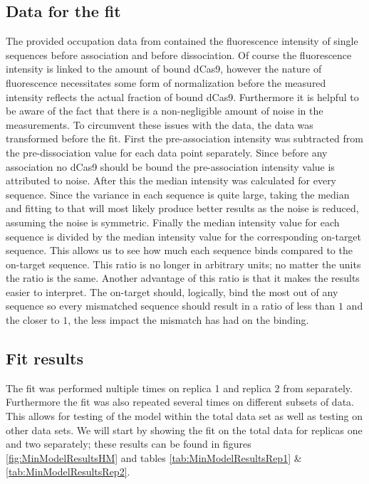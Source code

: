 \subsection{Data for the fit}
The provided occupation data from \cite{PNAS} contained the fluorescence intensity of single sequences before association and before dissociation. Of course the fluorescence intensity is linked to the amount of bound dCas9, however the nature of fluorescence necessitates some form of normalization before the measured intensity reflects the actual fraction of bound dCas9. Furthermore it is helpful to be aware of the fact that there is a non-negligible amount of noise in the measurements. %
To circumvent these issues with the data, the data was transformed before the fit. First the pre-association intensity was subtracted from the pre-dissociation value for each data point separately. Since before any association no dCas9 should be bound the pre-association intensity value is attributed to noise. After this the median intensity was calculated for every sequence. Since the variance in each sequence is quite large, taking the median and fitting to that will most likely produce better results as the noise is reduced, assuming the noise is symmetric. Finally the median intensity value for each sequence is divided by the median intensity value for the corresponding on-target sequence. This allows us to see how much each sequence binds compared to the on-target sequence. This ratio is no longer in arbitrary units; no matter the units the ratio is the same. Another advantage of this ratio is that it makes the results easier to interpret. The on-target should, logically, bind the most out of any sequence so every mismatched sequence should result in a ratio of less than $1$ and the closer to $1$, the less impact the mismatch has had on the binding.


\subsection{Fit results}
\label{sec:minmodelresults}


The fit was performed nultiple times on replica 1 and replica 2 from \cite{PNAS} separately. Furthermore the fit was also repeated several times on different subsets of data. This allows for testing of the model within the total data set as well as testing on other data sets. We will start by showing the fit on the total data for replicas one and two separately; these results can be found in figures \ref{fig:MinModelResultsHM} and tables \ref{tab:MinModelResultsRep1} \& \ref{tab:MinModelResultsRep2}. %


